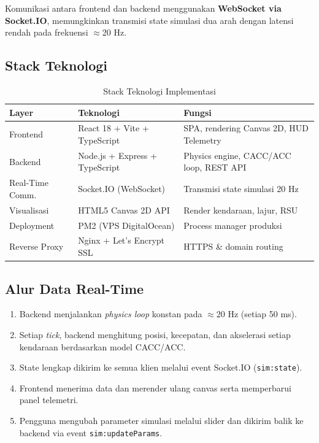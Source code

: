 \documentclass[12pt,a4paper]{article}
\begin{document}
Komunikasi antara frontend dan backend menggunakan \textbf{WebSocket via Socket.IO},
memungkinkan transmisi state simulasi dua arah dengan latensi rendah pada frekuensi
$\approx$20 Hz.

\subsection{Stack Teknologi}

\begin{table}[ht]
\centering
\caption{Stack Teknologi Implementasi}
\begin{tabularx}{\linewidth}{lXX}
\toprule
\textbf{Layer} & \textbf{Teknologi} & \textbf{Fungsi} \\
\midrule
Frontend & React 18 + Vite + TypeScript & SPA, rendering Canvas 2D, HUD Telemetry \\
Backend  & Node.js + Express + TypeScript & Physics engine, CACC/ACC loop, REST API \\
Real-Time Comm. & Socket.IO (WebSocket) & Transmisi state simulasi 20 Hz \\
Visualisasi & HTML5 Canvas 2D API & Render kendaraan, lajur, RSU \\
Deployment & PM2 (VPS DigitalOcean) & Process manager produksi \\
Reverse Proxy & Nginx + Let's Encrypt SSL & HTTPS \& domain routing \\
\bottomrule
\end{tabularx}
\end{table}

\subsection{Alur Data Real-Time}

\begin{enumerate}
  \item Backend menjalankan \textit{physics loop} konstan pada $\approx$20 Hz (setiap 50 ms).
  \item Setiap \textit{tick}, backend menghitung posisi, kecepatan, dan akselerasi setiap
        kendaraan berdasarkan model CACC/ACC.
  \item State lengkap dikirim ke semua klien melalui event Socket.IO (\texttt{sim:state}).
  \item Frontend menerima data dan merender ulang canvas serta memperbarui panel telemetri.
  \item Pengguna mengubah parameter simulasi melalui slider dan dikirim balik ke backend via
        event \texttt{sim:updateParams}.
\end{enumerate}
\end{document}
